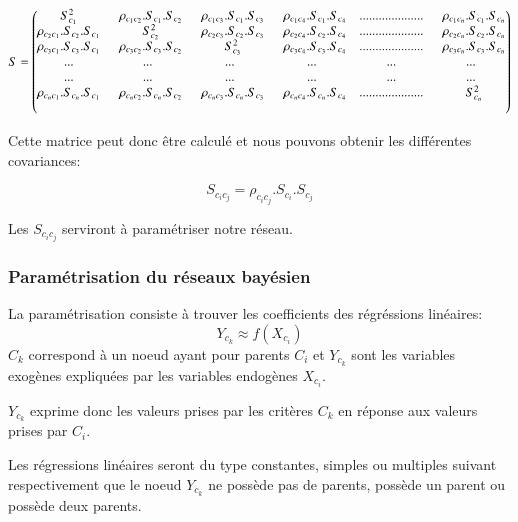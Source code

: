 \documentclass[a4paper]{article}
\begin{document}
$\\ \\  S=\begin{pmatrix}
S_{c_{1}}^2&\ \ \rho_{c_{1}c_{2}}.S_{c_{1}}.S_{c_{2}}&\ \ \rho_{c_{1}c_{3}}.S_{c_{1}}.S_{c_{3}}&\ \ \rho_{c_{1}c_{4}}.S_{c_{1}}.S_{c_{4}}&.................... &\ \ \rho_{c_{1}c_{n}}.S_{c_{1}}.S_{c_{n}}\\ 
\rho_{c_{2}c_{1}}.S_{c_{2}}.S_{c_{1}}&\ \ S_{c_{2}}^2&\ \ \rho_{c_{2}c_{3}}.S_{c_{2}}.S_{c_{3}}&\ \ \rho_{c_{2}c_{4}}.S_{c_{2}}.S_{c_{4}}&.................... &\ \ \rho_{c_{2}c_{n}}.S_{c_{2}}.S_{c_{n}}\\ 
\rho_{c_{3}c_{1}}.S_{c_{3}}.S_{c_{1}}&\ \ \rho_{c_{3}c_{2}}.S_{c_{3}}.S_{c_{2}}&\ \  S_{c_{3}}^2      &\ \ \rho_{c_{3}c_{4}}.S_{c_{3}}.S_{c_{4}}&.................... &\ \ \rho_{c_{3}c_{n}}.S_{c_{3}}.S_{c_{n}}\\ 
...&...&...&...&...&...  \\ 
...&...&...&...&...&...  \\ 

\rho_{c_{n}c_{1}}.S_ {c_{n}}.S_{c_{1}}&\ \ \rho_{c_{n}c_{2}}.S_ {c_{n}}.S_{c_{2}}&\ \ \rho_{c_{n}c_{3}}.S_ {c_{n}}.S_{c_{3}}&\ \ \rho_{c_{n}c_{4}}.S_ {c_{n}}.S_{c_{4}}&....................&\ \ S_{c_{n}}^2\\ \\ 

\end{pmatrix}$


Cette matrice peut donc être calculé et nous pouvons obtenir les différentes covariances:

$$S_ {c_{i}c_{j}}=\rho_{c_{i}c_{j}}.S_{c_{i}}.S_{c_{j}}$$

Les $S_ {c_{i}c_{j}}$ serviront  à paramétriser notre réseau.


\newpage
\subsubsection{Paramétrisation du réseaux bayésien}

La paramétrisation consiste à trouver les coefficients des régréssions linéaires: 
$$ Y_{c_{k}}\approx f(X_{c_{i}})$$ 
$C_{k}$ correspond à un noeud ayant pour parents $C_{i}$ et $ Y_{c_{k}}$ sont les variables exogènes expliquées par les variables endogènes $X_{c_{i}}$. 

$Y_{c_{k}}$ exprime donc les valeurs prises par les critères $C_{k}$ en réponse aux valeurs prises par $C_{i}$.

Les  régressions linéaires seront du type constantes, simples ou multiples suivant respectivement que le noeud $Y_{c_{k}}$ ne possède pas de parents, possède un parent ou possède deux parents.
\end{document}
